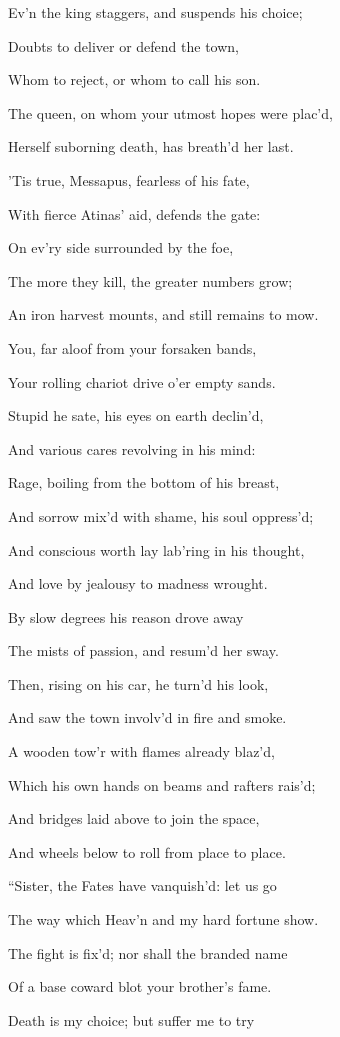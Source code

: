 Ev’n the king staggers, and suspends his choice;

Doubts to deliver or defend the town,

Whom to reject, or whom to call his son.

The queen, on whom your utmost hopes were plac’d,

Herself suborning death, has breath’d her last.

’Tis true, Messapus, fearless of his fate,

With fierce Atinas’ aid, defends the gate:

On ev’ry side surrounded by the foe,

The more they kill, the greater numbers grow;

An iron harvest mounts, and still remains to mow.

You, far aloof from your forsaken bands,

Your rolling chariot drive o’er empty sands.

Stupid he sate, his eyes on earth declin’d,

And various cares revolving in his mind:

Rage, boiling from the bottom of his breast,

And sorrow mix’d with shame, his soul oppress’d;

And conscious worth lay lab’ring in his thought,

And love by jealousy to madness wrought.

By slow degrees his reason drove away

The mists of passion, and resum’d her sway.

Then, rising on his car, he turn’d his look,

And saw the town involv’d in fire and smoke.

A wooden tow’r with flames already blaz’d,

Which his own hands on beams and rafters rais’d;

And bridges laid above to join the space,

And wheels below to roll from place to place.

“Sister, the Fates have vanquish’d: let us go

The way which Heav’n and my hard fortune show.

The fight is fix’d; nor shall the branded name

Of a base coward blot your brother’s fame.

Death is my choice; but suffer me to try

